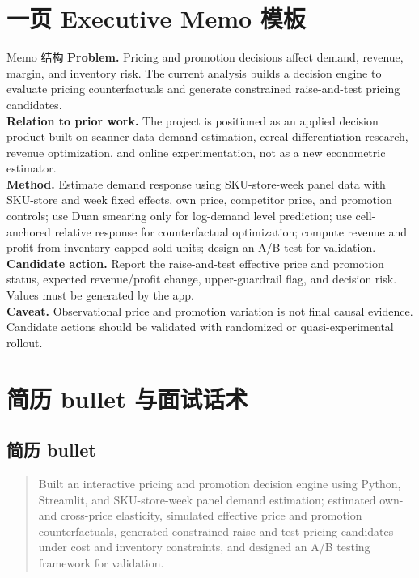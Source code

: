 \documentclass[UTF8,11pt,a4paper,fontset=none]{ctexart}
\begin{document}
\section{一页 Executive Memo 模板}

\begin{actionbox}{Memo 结构}
\textbf{Problem.} Pricing and promotion decisions affect demand, revenue, margin, and inventory risk. The current analysis builds a decision engine to evaluate pricing counterfactuals and generate constrained raise-and-test pricing candidates.\\[0.35em]
\textbf{Relation to prior work.} The project is positioned as an applied decision product built on scanner-data demand estimation, cereal differentiation research, revenue optimization, and online experimentation, not as a new econometric estimator.\\[0.35em]
\textbf{Method.} Estimate demand response using SKU-store-week panel data with SKU-store and week fixed effects, own price, competitor price, and promotion controls; use Duan smearing only for log-demand level prediction; use cell-anchored relative response for counterfactual optimization; compute revenue and profit from inventory-capped sold units; design an A/B test for validation.\\[0.35em]
\textbf{Candidate action.} Report the raise-and-test effective price and promotion status, expected revenue/profit change, upper-guardrail flag, and decision risk. Values must be generated by the app.\\[0.35em]
\textbf{Caveat.} Observational price and promotion variation is not final causal evidence. Candidate actions should be validated with randomized or quasi-experimental rollout.
\end{actionbox}

\section{简历 bullet 与面试话术}

\subsection{简历 bullet}

\begin{quote}
Built an interactive pricing and promotion decision engine using Python, Streamlit, and SKU-store-week panel demand estimation; estimated own- and cross-price elasticity, simulated effective price and promotion counterfactuals, generated constrained raise-and-test pricing candidates under cost and inventory constraints, and designed an A/B testing framework for validation.
\end{quote}
\end{document}

